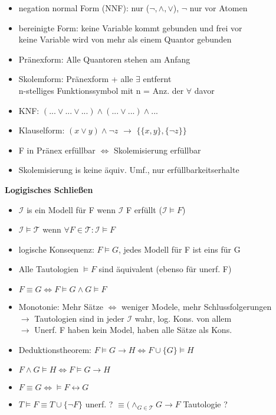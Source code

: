 \documentclass[12pt,a4paper]{article}
\begin{document}
\begin{paracol}{3}
\begin{itemize}
\item negation normal Form (NNF): nur ($\lnot, \land, \lor$), $\lnot$ nur vor Atomen
\item bereinigte Form: keine Variable kommt gebunden und frei vor\\keine Variable wird von mehr als einem Quantor gebunden
\item Pränexform: Alle Quantoren stehen am Anfang
\item Skolemform: Pränexform + alle $\exists$ entfernt\\n-stelliges Funktionssymbol mit n = Anz. der $\forall$ davor
\item KNF: $(...\lor ... \lor ...) \land (...\lor ...) \land ...$
\item Klauselform: $(x\lor y)\land \neg z$ $\rightarrow$ $\{\{x, y\}, \{\neg z\}\}$
\item F in Pränex erfüllbar $\Leftrightarrow$ Skolemisierung erfüllbar
\item Skolemisierung is keine äquiv. Umf., nur erfüllbarkeitserhalte
\end{itemize}
\switchcolumn[2]
\centering
\textbf{Logigisches Schließen}
\flushleft
\begin{itemize}
\setlength\itemsep{-0.5em}
\item $\mathcal{I}$ is ein Modell für F wenn $\mathcal{I}$ F erfüllt ($\mathcal{I}\models F$)
\item $\mathcal{I}\models\mathcal{T}$ wenn $\forall F \in \mathcal{T}: \mathcal{I}\models F$
\item logische Konsequenz: $F\models G$, jedes Modell für F ist eins für G
\item Alle Tautologien $\models F$ sind äquivalent (ebenso für unerf. F)
\item $F \equiv G \Leftrightarrow F\models G \land G \models F$
\item Monotonie: Mehr Sätze $\Leftrightarrow$ weniger Modele, mehr Schlussfolgerungen\\$\rightarrow$ Tautologien sind in jeder $\mathcal{I}$ wahr, log. Kons. von allem\\$\rightarrow$ Unerf. F haben kein Model, haben alle Sätze als Kons.
\item Deduktionstheorem: $F \models G \rightarrow H \Leftrightarrow F \cup \{G\} \models H$
\item $F \land G \models H \Leftrightarrow F \models G \rightarrow H$
\item $F\equiv G \Leftrightarrow \models F \leftrightarrow G$
\item $T \models F \equiv T \cup \{\neg F\}$ unerf. ? $\equiv (\land_{G\in\mathcal{T}} G \rightarrow F$ Tautologie ?
\end{itemize}
\end{paracol}
\newpage
\end{document}
